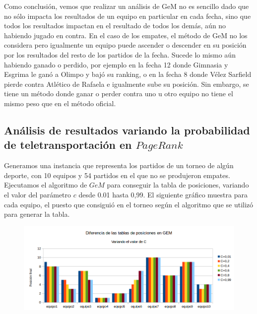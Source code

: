 Como conclusión, vemos que realizar un análisis de GeM no es sencillo dado que no sólo impacta los resultados de un equipo en particular en cada fecha, sino que todos los resultados impactan en el resultado de todos los demás, aún no habiendo jugado en contra. En el caso de los empates, el método de GeM no los considera pero igualmente un equipo puede ascender o descender en su posición por los resultados del resto de los partidos de la fecha. Sucede lo mismo aún habiendo ganado o perdido, por ejemplo en la fecha 12 donde Gimnasia y Esgrima le ganó a Olimpo y bajó su ranking, o en la fecha 8 donde Vélez Sarfield pierde contra Atlético de Rafaela e igualmente sube su posición. Sin embargo, se tiene un método donde ganar o perder contra uno u otro equipo no tiene el mismo peso que en el método oficial.


\subsection{Análisis de resultados variando la probabilidad de teletransportación en $PageRank$}

Generamos una instancia que representa los partidos de un torneo de algún deporte, con 10 equipos y 54 partidos en el que no se produjeron empates. Ejecutamos el algoritmo de $GeM$ para conseguir la tabla de posiciones, variando el valor del parámetro $c$ desde 0.01 hasta 0,99. El siguiente gráfico muestra para cada equipo, el puesto que consiguió en el torneo según el algoritmo que se utilizó para generar la tabla.\\



\begin{figure}[H]
\centering
\includegraphics[width=0.7\linewidth]{imagenes/variacionDeTablaGEM.png}
\end{figure}


